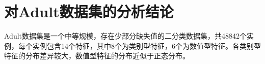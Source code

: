 \documentclass[12pt,a4paper]{article}
\theoremstyle{definition}
\begin{document}

\section{对Adult数据集的分析结论}

Adult数据集是一个中等规模，存在少部分缺失值的二分类数据集，共48842个实例，每个实例包含14个特征，其中8个为类别型特征，6个为数值型特征。各类别型特征的分布差异较大，数值型特征的分布近似于正态分布。
\end{document}

